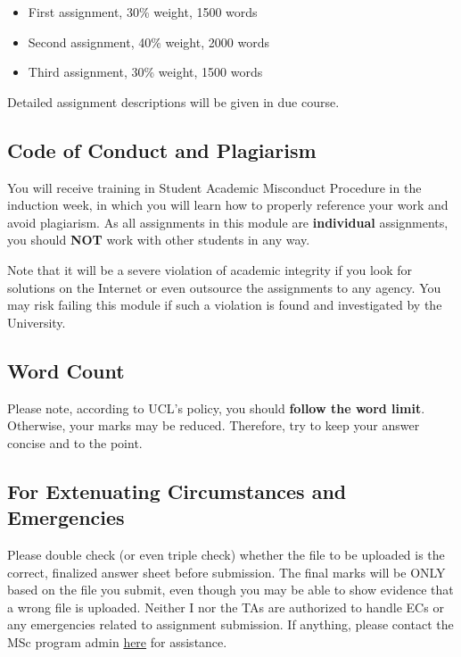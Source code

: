 \documentclass[
  11pt,
]{book}
\providecommand{\tightlist}{%
  \setlength{\itemsep}{0pt}\setlength{\parskip}{0pt}}
\begin{document}
\begin{itemize}
\tightlist
\item
  First assignment, 30\% weight, 1500 words
\item
  Second assignment, 40\% weight, 2000 words
\item
  Third assignment, 30\% weight, 1500 words
\end{itemize}

Detailed assignment descriptions will be given in due course.

\hypertarget{code-of-conduct-and-plagiarism}{%
\subsection{Code of Conduct and Plagiarism}\label{code-of-conduct-and-plagiarism}}

You will receive training in Student Academic Misconduct Procedure in the induction week, in which you will learn how to properly reference your work and avoid plagiarism. As all assignments in this module are \textbf{individual} assignments, you should \textbf{NOT} work with other students in any way.

Note that it will be a severe violation of academic integrity if you look for solutions on the Internet or even outsource the assignments to any agency. You may risk failing this module if such a violation is found and investigated by the University.

\hypertarget{word-count}{%
\subsection{Word Count}\label{word-count}}

Please note, according to UCL's policy, you should \textbf{follow the word limit}. Otherwise, your marks may be reduced. Therefore, try to keep your answer concise and to the point.

\hypertarget{for-extenuating-circumstances-and-emergencies}{%
\subsection{For Extenuating Circumstances and Emergencies}\label{for-extenuating-circumstances-and-emergencies}}

Please double check (or even triple check) whether the file to be uploaded is the correct, finalized answer sheet before submission. The final marks will be ONLY based on the file you submit, even though you may be able to show evidence that a wrong file is uploaded. Neither I nor the TAs are authorized to handle ECs or any emergencies related to assignment submission. If anything, please contact the MSc program admin \href{}{here} for assistance.
\end{document}
